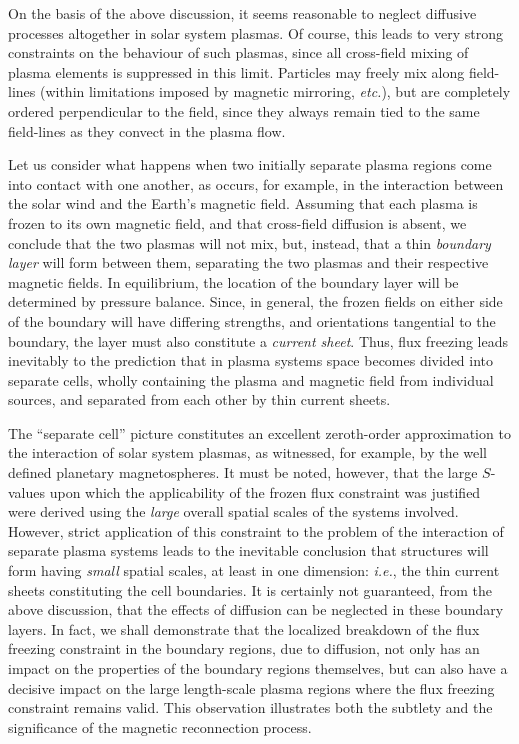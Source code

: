 On the basis of the above discussion, it seems reasonable to neglect diffusive
processes altogether in solar system plasmas. Of course, this leads to
very strong constraints on the behaviour of such plasmas, since all
cross-field mixing of plasma elements is suppressed in this limit. Particles
may freely mix along field-lines (within limitations imposed by magnetic
mirroring, {\em etc.}), but are completely ordered perpendicular to the field,
since they always remain tied to the same field-lines as they convect in the
plasma flow.

Let us consider what happens when two initially separate plasma regions
come into contact with one another, as occurs, for example, in the
interaction between the solar wind and the Earth's magnetic field.
Assuming that each plasma is frozen to its own magnetic field, and that cross-field
diffusion  is absent, we conclude that the two plasmas
will not mix, but, instead, that a thin {\em boundary layer} will form
between them, separating the two plasmas and their respective magnetic fields.
In equilibrium, the location of the boundary layer will be determined
by pressure balance. Since, in general, the frozen fields on either side of
the boundary will have differing strengths, and orientations tangential
to the boundary, the layer must also constitute a {\em current sheet}. 
Thus, flux freezing leads inevitably to the prediction that in plasma
systems space becomes divided into separate cells, wholly containing the 
plasma and magnetic field  from individual sources, and separated from
each other by thin current sheets. 

The ``separate cell'' picture constitutes an excellent zeroth-order approximation to
the interaction of solar system plasmas, as witnessed, for example, by
the well defined planetary magnetospheres. It must be noted, however, that
the large $S$-values upon which the applicability of the frozen flux constraint
was justified were derived using the {\em large} overall spatial scales of the
systems involved. However, strict application of this constraint to the
problem of the interaction of separate plasma systems leads to the 
inevitable conclusion
that structures will form having {\em small} spatial scales, at least in
one dimension: {\em i.e.}, the thin current sheets constituting the cell
boundaries. It is certainly not guaranteed, from the above discussion,  that
the effects of diffusion can be neglected in 
 these boundary layers.  In fact, we shall demonstrate that 
the localized breakdown of the flux freezing constraint in the boundary
regions, due to diffusion, not only has an impact on the
properties of the boundary regions themselves, but can also have a decisive
impact on the large length-scale plasma regions where the flux freezing 
constraint remains valid. This observation illustrates both the subtlety and the
significance of the magnetic reconnection process. 

